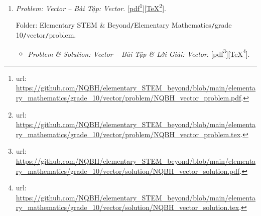 \documentclass[12pt,oneside]{book}
\begin{document}
\begin{enumerate}
\begin{itemize}
		Folder: {\sf Elementary STEM \& Beyond{\tt/}Elementary Mathematics{\tt/}grade 10{\tt/}trigonometry{\tt/}solution}.
	\end{itemize}
	{\it A bridge between Elementary Algebra \& Elementary Geometric $+$ Trigonometric -- Nhịp cầu nối giữa Đại Số Sơ Cấp với Hình Học Sơ Cấp \& Lượng giác}: Các yếu tố hình học \& lượng giác của tam giác, e.g., cạnh $a,b,c$, đường cao $h_a,h_b,h_c$, đường trung tuyến $m_a,m_b,m_c$, đường phân giác trong $l_a,l_b,l_c$, các bán kính đường tròn nội tiếp $r$, ngoại tiếp $R$, bàng tiếp $r_a,r_b,r_c,\ldots$ \& các tỷ số lượng giác $\sin,\cos,\tan,\cot,\ldots$ các góc $\angle A,\angle B,\angle C$ của tam giác, chính là các nghiệm của phương trình bậc 3 (3rd-degree polynomial equation or cubic equation) mà các hệ số phụ thuộc vào 3 yếu tố cơ bản $p,R,r$, lần lượt là nửa chu vi, bán kính đường tròn ngoại tiếp, nội tiếp của tam giác, see \cite{Phuong_Quan_ptb3_htl}.
	\item {\it Problem: Vector -- Bài Tập: Vector}. [\href{https://github.com/NQBH/elementary_STEM_beyond/blob/main/elementary_mathematics/grade_10/vector/problem/NQBH_vector_problem.pdf}{pdf}\footnote{{\sc url}: \url{https://github.com/NQBH/elementary_STEM_beyond/blob/main/elementary_mathematics/grade_10/vector/problem/NQBH_vector_problem.pdf}.}][\href{https://github.com/NQBH/elementary_STEM_beyond/blob/main/elementary_mathematics/grade_10/vector/problem/NQBH_vector_problem.tex}{\TeX}\footnote{{\sc url}: \url{https://github.com/NQBH/elementary_STEM_beyond/blob/main/elementary_mathematics/grade_10/vector/problem/NQBH_vector_problem.tex}.}].
	
	Folder: {\sf Elementary STEM \& Beyond{\tt/}Elementary Mathematics{\tt/}grade 10{\tt/}vector{\tt/}problem}.
	\begin{itemize}
		\item {\it Problem \& Solution: Vector -- Bài Tập \& Lời Giải: Vector}. [\href{https://github.com/NQBH/elementary_STEM_beyond/blob/main/elementary_mathematics/grade_10/vector/solution/NQBH_vector_solution.pdf}{pdf}\footnote{{\sc url}: \url{https://github.com/NQBH/elementary_STEM_beyond/blob/main/elementary_mathematics/grade_10/vector/solution/NQBH_vector_solution.pdf}.}][\href{https://github.com/NQBH/elementary_STEM_beyond/blob/main/elementary_mathematics/grade_10/vector/solution/NQBH_vector_solution.tex}{\TeX}\footnote{{\sc url}: \url{https://github.com/NQBH/elementary_STEM_beyond/blob/main/elementary_mathematics/grade_10/vector/solution/NQBH_vector_solution.tex}.}].
		

\end{itemize}
\end{enumerate}
\end{document}
